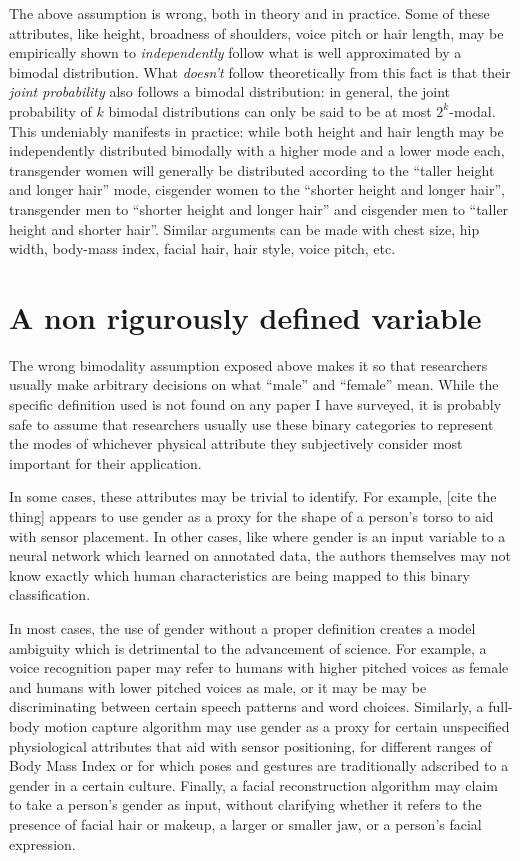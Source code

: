 \documentclass[acmtog,nonacm,review,balance=false]{acmart}
\begin{document}
The above assumption is wrong, both in theory and in practice. Some of these
attributes, like height, broadness of shoulders, voice pitch or hair length, may be empirically
shown to \emph{independently} follow what is well approximated by a
bimodal distribution. 
What \emph{doesn't} follow theoretically from this fact is that their \emph{joint probability}
also follows a bimodal distribution: in general, the joint probability of $k$
bimodal distributions can only be said to be at most $2^k$-modal. This
undeniably manifests
in practice: while both height and hair length may be independently distributed
bimodally with a higher mode and a lower mode each, transgender women will
generally be distributed according to the ``taller height and longer hair''
mode, cisgender women to the ``shorter height and longer hair'', transgender men
to ``shorter height and longer hair'' and cisgender men to ``taller height and
shorter hair''. Similar arguments can be made with chest size, hip width,
body-mass index, facial hair, hair style, voice pitch, etc.

\section{A non rigurously defined variable}

The wrong bimodality assumption exposed above makes it so that researchers
usually make arbitrary decisions on what ``male'' and ``female'' mean. While the
specific definition used is not found on any paper I have surveyed, it is
probably safe to assume that researchers usually use these binary categories to
represent the modes of whichever physical attribute they subjectively consider
most important for their application.

In some cases, these attributes may be trivial to identify. For example, [cite
the thing] appears to use gender as a proxy for the shape of a person's torso to
aid with sensor placement. In other cases, like where gender is an input
variable to a neural network which learned on annotated data, the authors
themselves may not know exactly which human characteristics are being mapped to
this binary classification.

In most cases, the use of gender without a proper definition creates a model
ambiguity which is detrimental to the advancement of science. For example, a 
voice recognition paper may refer to humans with higher pitched
voices as female and humans with lower pitched voices as male, or it may be
may be discriminating between certain speech patterns and word choices.
Similarly, a full-body motion capture algorithm may use gender as a proxy for
certain unspecified physiological attributes that aid with sensor positioning,
for different ranges of Body Mass Index or for which poses and gestures are traditionally
adscribed to a gender in a certain culture. Finally, a facial reconstruction
algorithm may claim to take a person's gender as input, without clarifying
whether it refers to the presence of facial hair or makeup, a larger or smaller
jaw, or a person's facial expression.
\end{document}
